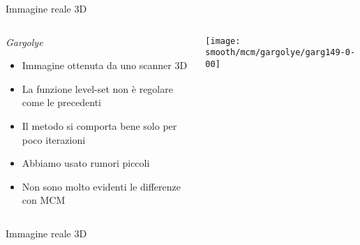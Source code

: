 \begin{frame}{Immagine reale 3D}
 \begin{columns}[T]
    \begin{column}{4cm}
      \begin{block}{\emph{Gargolye}}
        \begin{itemize}
        \item Immagine ottenuta da uno scanner 3D
        \item La funzione level-set non è regolare come le precedenti 
        \item Il metodo si comporta bene solo per poco iterazioni
        \item Abbiamo usato rumori piccoli
        \item Non sono molto evidenti le differenze con MCM
        \end{itemize}
      \end{block}
    \end{column}
   \begin{column}{6cm}
     \texttt{[image: smooth/mcm/gargolye/garg149-0-00]}
   \end{column}
  \end{columns}
\end{frame}

\begin{frame}{Immagine reale 3D}
  \begin{columns}[T]
  \begin{column}{5cm}
    \centering
    \end{column}
  \begin{column}[T]{5cm}
    \centering
    \end{column}
 \end{columns}
\end{frame}
